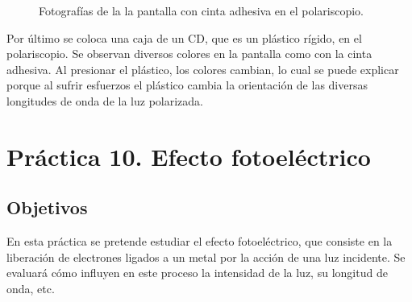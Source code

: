 \documentclass[12pt]{article}
\numberwithin{table}{section}
\numberwithin{figure}{section}
\numberwithin{equation}{section}
\begin{document}
\begin{figure}[!ht]
\begin{center}
\caption{Fotografías de la la pantalla con cinta adhesiva en el polariscopio.}\label{P5colorines}
\end{center}
\end{figure}

Por último se coloca una caja de un CD, que es un plástico rígido, en el polariscopio. Se observan diversos colores en la pantalla como con la cinta adhesiva. Al presionar el plástico, los colores cambian, lo cual se puede explicar porque al sufrir esfuerzos el plástico cambia la orientación de las diversas longitudes de onda de la luz polarizada.

\section{Práctica 10. Efecto fotoeléctrico}
\subsection{Objetivos}
En esta práctica se pretende estudiar el efecto fotoeléctrico, que consiste en la liberación de electrones ligados a un metal por la acción de una luz incidente. Se evaluará cómo influyen en este proceso la intensidad de la luz, su longitud de onda, etc.
\end{document}
